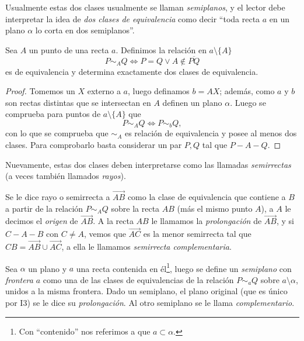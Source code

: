 \documentclass[11pt,a4paper]{book}
\begin{document}
Usualmente estas dos clases usualmente se llaman \textit{semiplanos}, y el lector debe interpretar la idea de \textit{dos clases de equivalencia} como decir ``toda recta $a$ en un plano $\alpha$ lo corta en dos semiplanos''.
\begin{thm}
Sea $A$ un punto de una recta $a$. Definimos la relación en $a\setminus\{A\}$
$$P\sim_A Q\iff P=Q\vee A\notin\overline{PQ}$$
es de equivalencia y determina exactamente dos clases de equivalencia.
\end{thm}
\begin{proof}
Tomemos un $X$ externo a $a$, luego definamos $b=AX$; además, como $a$ y $b$ son rectas distintas que se intersectan en $A$ definen un plano $\alpha$. Luego se comprueba para puntos de $a\setminus\{A\}$ que
$$P\sim_A Q\iff P\sim_b Q,$$
con lo que se comprueba que $\sim_A$ es relación de equivalencia y posee al menos dos clases. Para comprobarlo basta considerar un par $P,Q$ tal que $P-A-Q$.
\end{proof}
Nuevamente, estas dos clases deben interpretarse como las llamadas \textit{semirrectas} (a veces también llamados \textit{rayos}).
\begin{mydef}
Se le dice rayo o semirrecta a $\overrightarrow{AB}$ como la clase de equivalencia que contiene a $B$ a partir de la relación $P\sim_A Q$ sobre la recta $AB$ (más el mismo punto $A$), a $A$ le decimos el \textit{origen} de $\overrightarrow{AB}$. A la recta $AB$ le llamamos la \textit{prolongación} de $\overrightarrow{AB}$, y si $C-A-B$ con $C\neq A$, vemos que $\overrightarrow{AC}$ es la menor semirrecta tal que $CB=\overrightarrow{AB}\cup\overrightarrow{AC}$, a ella le llamamos \textit{semirrecta complementaria}.
\end{mydef}
\begin{mydef}[Semiplano]
Sea $\alpha$ un plano y $a$ una recta contenida en él\footnote{Con ``contenido'' nos referimos a que $a \subset\alpha$.}, luego se define un \textit{semiplano} con \textit{frontera} $a$ como una de las clases de equivalencias de la relación $P\sim_a Q$ sobre $a\setminus\alpha$, unidos a la misma frontera. Dado un semiplano, el plano original (que es único por I3) se le dice su \textit{prolongación}. Al otro semiplano se le llama \textit{complementario}.
\end{mydef}
\end{document}
